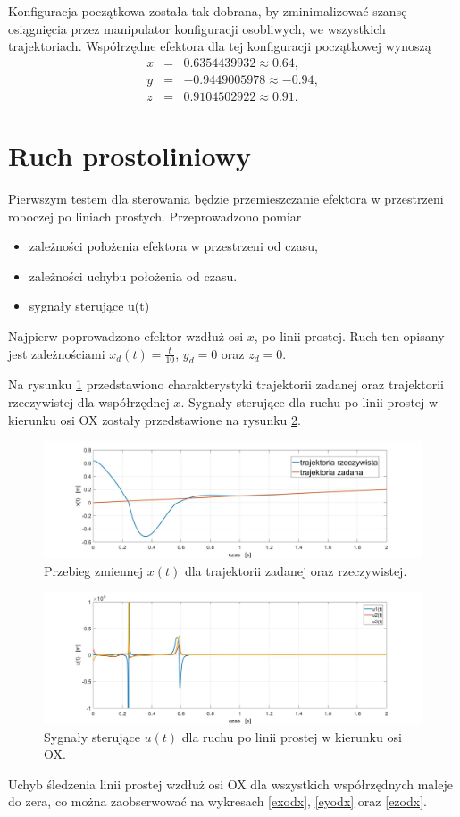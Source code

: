 \documentclass[eng,printmode]{mgr}
\begin{document}
Konfiguracja początkowa została tak dobrana, by zminimalizować szansę osiągnięcia przez manipulator konfiguracji osobliwych, we wszystkich trajektoriach. Współrzędne efektora dla tej konfiguracji początkowej wynoszą
\begin{eqnarray}
x&=& 0.6354439932\approx 0.64, \\ \nonumber
y&=& -0.9449005978\approx -0.94,\\ \nonumber
z&=& 0.9104502922\approx 0.91. \nonumber
\end{eqnarray}

\newpage
\section{Ruch prostoliniowy}
Pierwszym testem dla sterowania będzie przemieszczanie efektora w przestrzeni roboczej po liniach prostych. Przeprowadzono pomiar 
\begin{itemize}
\item zależności położenia efektora w przestrzeni od czasu,
\item zależności uchybu położenia od czasu.
\item sygnały sterujące u(t)
\end{itemize}
Najpierw poprowadzono efektor wzdłuż osi $x$, po linii prostej. Ruch ten opisany jest zależnościami $x_d(t)=\frac{t}{10}$, $y_d=0$ oraz $z_d=0$.

Na rysunku \ref{odx} przedstawiono charakterystyki trajektorii zadanej oraz trajektorii rzeczywistej dla współrzędnej $x$.
Sygnały sterujące dla ruchu po linii prostej w kierunku osi OX zostały przedstawione na rysunku \ref{uodx}.
\hfill \break
\begin{figure}[!h]
\centering
\includegraphics[width=1\textwidth]{odx.jpg}
\caption{\label{odx}Przebieg zmiennej $x(t)$ dla trajektorii zadanej oraz rzeczywistej.}
\end{figure}
\begin{figure}[!h]
\centering
\includegraphics[width=1\textwidth]{uodx.jpg}
\caption{\label{uodx}Sygnały sterujące $u(t)$ dla ruchu po linii prostej w kierunku osi OX.}
\end{figure}
\newpage
Uchyb śledzenia linii prostej wzdłuż osi OX dla wszystkich współrzędnych maleje do zera, co można zaobserwować na wykresach \ref{exodx}, \ref{eyodx} oraz \ref{ezodx}.
\end{document}
